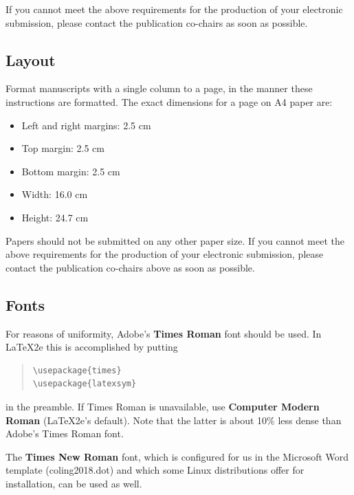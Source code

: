 \documentclass[11pt]{article}
\begin{document}
If you cannot meet the above requirements
for the
production of your electronic submission, please contact the
publication co-chairs as soon as possible.


\subsection{Layout}
\label{ssec:layout}

Format manuscripts with a single column to a page, in the manner these
instructions are formatted. The exact dimensions for a page on A4
paper are:

\begin{itemize}
\item Left and right margins: 2.5 cm
\item Top margin: 2.5 cm
\item Bottom margin: 2.5 cm
\item Width: 16.0 cm
\item Height: 24.7 cm
\end{itemize}

\noindent Papers should not be submitted on any other paper size.
If you cannot meet the above requirements for
the production of your electronic submission, please contact the
publication co-chairs above as soon as possible.


\subsection{Fonts}

For reasons of uniformity, Adobe's {\bf Times Roman} font should be
used. In \LaTeX2e{} this is accomplished by putting

\begin{quote}
\begin{verbatim}
\usepackage{times}
\usepackage{latexsym}
\end{verbatim}
\end{quote}
in the preamble. If Times Roman is unavailable, use {\bf Computer
  Modern Roman} (\LaTeX2e{}'s default).  Note that the latter is about
  10\% less dense than Adobe's Times Roman font.

The {\bf Times New Roman} font, which is configured for us in the
Microsoft Word template (coling2018.dot) and which some Linux
distributions offer for installation, can be used as well.
\end{document}
